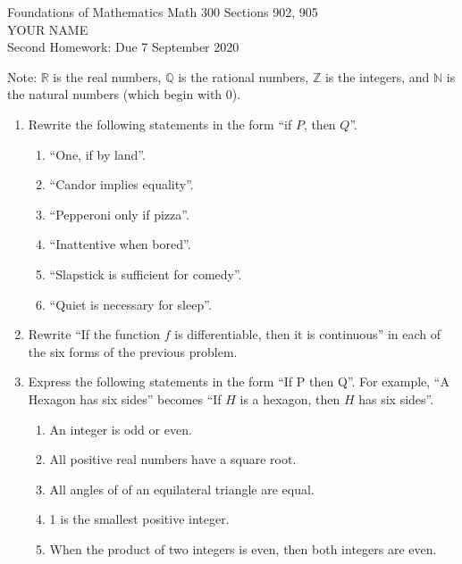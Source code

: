 \documentclass[12pt]{article}
\newcommand{\deco}[1]{{\color{blue} #1}}
\newcommand{\NN}{{\mathbb N}}
\newcommand{\QQ}{{\mathbb Q}}
\newcommand{\RR}{{\mathbb R}}
\newcommand{\ZZ}{{\mathbb Z}}
\begin{document}
\LARGE 
\noindent
{\color{Maroon}Foundations of Mathematics \hfill Math 300 Sections 902, 905}\vspace{2pt}\\
\Large YOUR NAME\vspace{2pt}\\
\large
Second Homework: \hfill Due 7 September 2020
\normalsize\vspace{10pt}


Note:  \deco{$\RR$} is the real numbers, \deco{$\QQ$} is the rational numbers, \deco{$\ZZ$} is the integers, and
\deco{$\NN$} is the natural numbers (which begin with 0).

\begin{enumerate}

\item  Rewrite the following statements in the form ``if $P$, then $Q$''.
  \begin{enumerate}

    \item ``One, if by land''.
    \item ``Candor implies equality''.
    \item ``Pepperoni only if pizza''.
    \item ``Inattentive when bored''.
    \item ``Slapstick is sufficient for comedy''.
    \item ``Quiet is necessary for sleep''.

  \end{enumerate}


\item Rewrite ``If the function $f$ is differentiable, then it is continuous'' in each of the six forms of the previous problem.


\item Express the following statements in the form ``If P then Q''.
  For example, ``A Hexagon has six sides'' becomes ``If $H$ is a hexagon, then $H$ has six sides''.
  \begin{enumerate}
   
   \item An integer is odd or even.
   \item All positive real numbers have a square root.
   \item All angles of of an equilateral triangle are equal.
   \item 1 is the smallest positive integer.
   \item When the product of two integers is even, then both integers are even.
     

\end{enumerate}
\end{enumerate}
\end{document}

